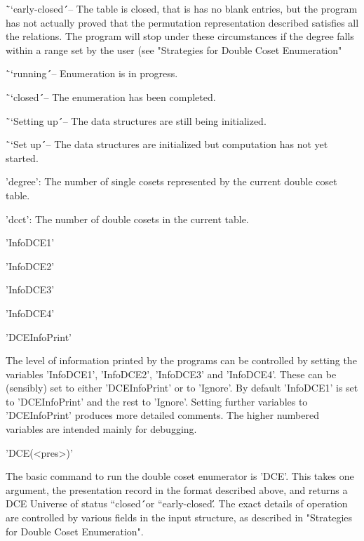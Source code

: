 \= ``early-closed\'\'\ -- The  table  is  closed,  that is  has  no blank
entries, but the program   has not actually  proved that  the permutation
representation described  satisfies  all the relations.  The program will
stop under these circumstances if the degree falls within  a range set by
the user (see "Strategies for Double Coset Enumeration"

\= ``running\'\'\ -- Enumeration is in progress.

\= ``closed\'\'\ -- The enumeration has been completed.

\= ``Setting up\'\'\ --  The data structures are still being initialized.

\= ``Set up\'\'\ --  The data structures  are initialized but computation
has not yet started.

'degree': The  number of single  cosets represented by the current double
coset table.

'dcct': The number of double cosets in the current table.


'InfoDCE1'

'InfoDCE2'

'InfoDCE3'

'InfoDCE4'

'DCEInfoPrint'

The level of information printed  by the programs   can be controlled  by
setting  the    variables    'InfoDCE1',  'InfoDCE2',    'InfoDCE3'   and
'InfoDCE4'. These can be  (sensibly) set to  either 'DCEInfoPrint'  or to
'Ignore'. By default 'InfoDCE1' is set  to 'DCEInfoPrint' and the rest to
'Ignore'.   Setting further variables   to  'DCEInfoPrint'  produces more
detailed comments. The higher numbered  variables are intended mainly for
debugging.


'DCE(<pres>)'

The basic command to run the double coset enumerator is 'DCE'. This takes
one argument, the presentation record in  the format described above, and
returns a DCE Universe of status ``closed\'\'\ or ``early-closed\'\'. The
exact details of operation are controlled by various  fields in the input
structure, as described in "Strategies for Double Coset Enumeration".


